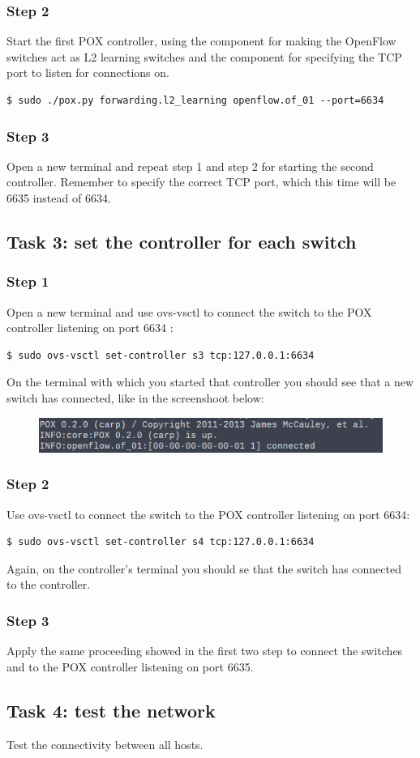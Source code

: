\subsubsection*{Step 2}
Start the first POX controller, using the component 
for making the OpenFlow switches act as L2 learning switches and the component
 for specifying the TCP port to listen for connections on.

\lstset{basicstyle=\scriptsize\ttfamily}
\begin{lstlisting}
$ sudo ./pox.py forwarding.l2_learning openflow.of_01 --port=6634
\end{lstlisting}

\subsubsection*{Step 3}
Open a new terminal and repeat step 1 and step 2 for starting the second controller.
Remember to specify the correct TCP port, which this time will be 6635 instead of 6634.




\subsection*{Task 3: set the controller for each switch}
\subsubsection*{Step 1}
Open a new terminal and use ovs-vsctl to connect the switch  to the POX
controller listening on port 6634 \parencite{ref-8}:
\begin{lstlisting}
$ sudo ovs-vsctl set-controller s3 tcp:127.0.0.1:6634
\end{lstlisting}
On the terminal with which you started that controller you should see that a new
switch has connected, like in the screenshoot below:
\begin{figure}[htb]
	\centering
	\includegraphics[width=1\linewidth]{img/controller-connection.png}
\end{figure}


\subsubsection*{Step 2}
Use ovs-vsctl to connect the switch  to the POX controller listening on
port 6634:
\begin{lstlisting}
$ sudo ovs-vsctl set-controller s4 tcp:127.0.0.1:6634
\end{lstlisting}
Again, on the controller's terminal you should se that the switch has connected
to the controller.


\subsubsection*{Step 3}
Apply the same proceeding showed in the first two step to connect the switches
 and  to the POX controller listening on port 6635.



\subsection*{Task 4: test the network}
Test the connectivity between all hosts.
